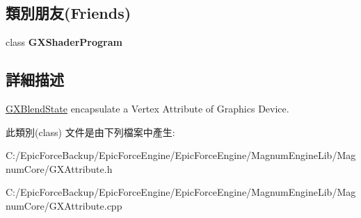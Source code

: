 \subsection*{類別朋友(Friends)}
\begin{DoxyCompactItemize}
\item 
class {\bfseries G\+X\+Shader\+Program}\hypertarget{class_magnum_1_1_g_x_attribute_a4a6e107978c21d22d7e96be0f48962d2}{}\label{class_magnum_1_1_g_x_attribute_a4a6e107978c21d22d7e96be0f48962d2}

\end{DoxyCompactItemize}


\subsection{詳細描述}
\hyperlink{class_magnum_1_1_g_x_blend_state}{G\+X\+Blend\+State} encapsulate a Vertex Attribute of Graphics Device. 

此類別(class) 文件是由下列檔案中產生\+:\begin{DoxyCompactItemize}
\item 
C\+:/\+Epic\+Force\+Backup/\+Epic\+Force\+Engine/\+Epic\+Force\+Engine/\+Magnum\+Engine\+Lib/\+Magnum\+Core/G\+X\+Attribute.\+h\item 
C\+:/\+Epic\+Force\+Backup/\+Epic\+Force\+Engine/\+Epic\+Force\+Engine/\+Magnum\+Engine\+Lib/\+Magnum\+Core/G\+X\+Attribute.\+cpp\end{DoxyCompactItemize}
